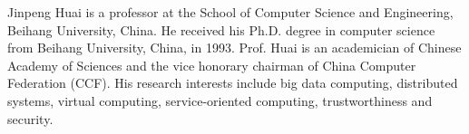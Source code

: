 \vspace{-8ex}
\begin{IEEEbiography}{Jinpeng Huai} is a professor at the School of Computer Science and Engineering, Beihang University, China. He received his Ph.D. degree in computer science from Beihang University, China, in 1993. Prof. Huai is an academician of Chinese Academy of Sciences and the vice honorary chairman of China Computer Federation (CCF). His research interests include big data computing, distributed systems, virtual computing, service-oriented computing, trustworthiness and security.
\end{IEEEbiography}
